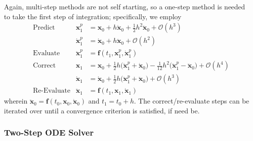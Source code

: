 Again, multi-step methods are not self starting, so a one-step method is needed to take the first step of integration; specifically, we employ
\begin{subequations}
    \label{pairedStartUp}
    \begin{align}
    \mbox{} & \text{Predict} & 
    \mathbf{x}_1^p & = \mathbf{x}_0 + h \dot{\mathbf{x}}_0 +
    \tfrac{1}{2} h^2 \ddot{\mathbf{x}}_0 + \mathcal{O} (h^3) 
    \label{startupDisplacementPredictor} \\
    \mbox{} & &
    \dot{\mathbf{x}}^p_1 & = \dot{\mathbf{x}}_0 + h \ddot{\mathbf{x}}_0 + 
    \mathcal{O} (h^2) 
    \label{startUpVelocityPredictor} \\
    \mbox{} & \text{Evaluate} &
    \ddot{\mathbf{x}}^p_1 & = \mathbf{f} (t_1, \mathbf{x}^p_1, \dot{\mathbf{x}}^p_1)
    \label{startUpEvaluate} \\
    \mbox{} & \text{Correct} &
    \mathbf{x}_1 & = \mathbf{x}_0 + \tfrac{1}{2} h 
    \bigl( \dot{\mathbf{x}}^p_1 + \dot{\mathbf{x}}_0 \bigr) -
    \tfrac{1}{12} h^2 \bigl( \ddot{\mathbf{x}}^p_1 - 
    \ddot{\mathbf{x}}_0 \bigr) + \mathcal{O} (h^4) 
    \label{startupDisplacementCorrector} \\
    \mbox{} & &
    \dot{\mathbf{x}}_1 & = \dot{\mathbf{x}}_0 + \tfrac{1}{2} h 
    \bigl( \ddot{\mathbf{x}}_1^p + \ddot{\mathbf{x}}_0 \bigr) + 
    \mathcal{O} (h^3)
    \label{startUpVelocityCorrector} \\
    \mbox{} & \text{Re-Evaluate} &
    \ddot{\mathbf{x}}_1 & = \mathbf{f} (t_1, \mathbf{x}_1, \dot{\mathbf{x}}_1) 
    \label{startUpReEvaluate}
    \end{align}
\end{subequations}
wherein $\ddot{\mathbf{x}}_0 = \mathbf{f}(t_0, \mathbf{x}_0, \dot{\mathbf{x}}_0)$ and $t_1 = t_0 + h$.  The correct\slash re-evaluate steps can be iterated over until a convergence criterion is satisfied, if need be.

\subsubsection{Two-Step ODE Solver}

